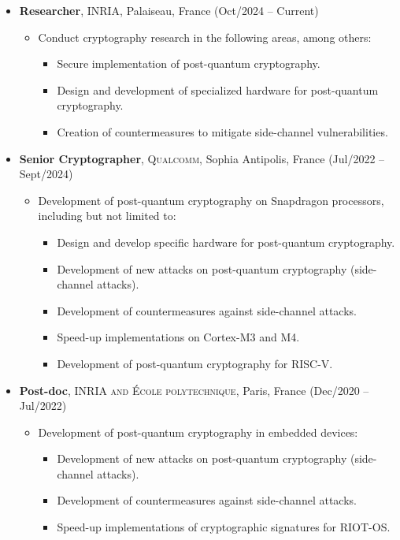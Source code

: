 \documentclass[11pt, a4paper]{article}
\begin{document}
\begin{itemize}
    \item \textbf{Researcher}, \textsc{INRIA}, Palaiseau, France (Oct/2024 -- Current)
    \begin{itemize}
        \item Conduct cryptography research in the following areas, among others:
        \begin{itemize}
            \item Secure implementation of post-quantum cryptography.
            \item Design and development of specialized hardware for post-quantum cryptography.
            \item Creation of countermeasures to mitigate side-channel vulnerabilities.
        \end{itemize}
    \end{itemize}

    \item \textbf{Senior Cryptographer}, \textsc{Qualcomm}, Sophia Antipolis, France (Jul/2022 -- Sept/2024)
    \begin{itemize}
        \item Development of post-quantum cryptography on Snapdragon processors, including but not limited to:
        \begin{itemize}
            \item Design and develop specific hardware for post-quantum cryptography.
            \item Development of new attacks on post-quantum cryptography (side-channel attacks).
            \item Development of countermeasures against side-channel attacks.
            \item Speed-up implementations on Cortex-M3 and M4.
            \item Development of post-quantum cryptography for RISC-V. 
        \end{itemize}
    \end{itemize}

    \item \textbf{Post-doc}, \textsc{INRIA and \'{E}cole polytechnique}, Paris, France (Dec/2020 -- Jul/2022)
    \begin{itemize}
        \item Development of post-quantum cryptography in embedded devices:
        \begin{itemize}
            \item Development of new attacks on post-quantum cryptography (side-channel attacks).
            \item Development of countermeasures against side-channel attacks.
            \item Speed-up implementations of cryptographic signatures for RIOT-OS.
        \end{itemize}
    \end{itemize}


\end{itemize}
\end{document}
